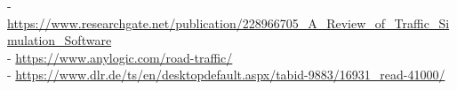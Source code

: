 
\begin{thebibliography}{x}

- \url{https://www.researchgate.net/publication/228966705_A_Review_of_Traffic_Simulation_Software}\\
- \url{https://www.anylogic.com/road-traffic/}\\
- \url{https://www.dlr.de/ts/en/desktopdefault.aspx/tabid-9883/16931_read-41000/}
\end{thebibliography}
